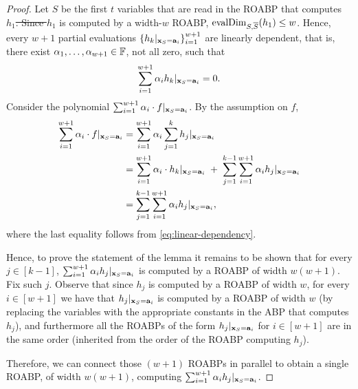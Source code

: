\documentclass[11pt]{article}
\providecommand{\DIFadd}[1]{{\protect\color{blue}\uwave{#1}}} %
\providecommand{\DIFdel}[1]{{\protect\color{red}\sout{#1}}}                      %
\providecommand{\DIFaddbegin}{} %
\providecommand{\DIFaddend}{} %
\providecommand{\DIFdelbegin}{} %
\providecommand{\DIFdelend}{} %
\begin{document}
\begin{proof}
Let $S$ be the first $t$ variables that are read in the ROABP that computes \DIFdelbegin \DIFdel{$h_1$. Since $h_1$ }\DIFdelend \DIFaddbegin \DIFadd{$h_k$. Since $h_k$ }\DIFaddend is computed by a width-$w$ ROABP, $\operatorname{evalDim}_{S, \overline{S}} (h_1) \le w$. Hence, every $w+1$ partial evaluations $\left\{ h_k|_{\mathbf{x}_S=\mathbf{a}_i} \right\}_{i=1}^{w+1}$ are linearly dependent, that is, there exist  $\alpha_1, \ldots, \alpha_{w+1} \in \F$, not all zero, such that
\begin{equation}
\label{eq:linear-dependency}
\sum_{i=1}^{w+1} \alpha_i h_k|_{\mathbf{x}_S = \mathbf{a}_i} = 0.
\end{equation}
Consider the polynomial $\sum_{i=1}^{w+1} \alpha_i \cdot f|_{\mathbf{x}_S = \mathbf{a}_i}$. By the assumption on $f$,
\begin{align}
\label{eq:sum-of-c-1}
\sum_{i=1}^{w+1} \alpha_i \cdot f|_{\mathbf{x}_S = \mathbf{a}_i} & = \sum_{i=1}^{w+1} \alpha_i \sum_{j=1}^k h_j |_{\mathbf{x}_S = \mathbf{a}_i} \nonumber \\
&= \sum_{i=1}^{w+1} \alpha_i \cdot  h_k|_{\mathbf{x}_S = \mathbf{a}_i} \;+\; \sum_{j=1}^{k-1}  \sum_{i=1}^{w+1} \alpha_i h_j |_{\mathbf{x}_S = \mathbf{a}_i} \nonumber \\
&=  \sum_{j=1}^{k-1}  \sum_{i=1}^{w+1} \alpha_i h_j |_{\mathbf{x}_S = \mathbf{a}_i},
\end{align}
where the last equality follows from \eqref{eq:linear-dependency}.

Hence, to prove the statement of the lemma it remains to be shown that for every $j \in [k-1]$, $\sum_{i=1}^{w+1} \alpha_i h_j |_{\mathbf{x}_S = \mathbf{a}_i}$ is computed by a ROABP of width $w(w+1)$. Fix such $j$. Observe that since $h_j$ is computed by a ROABP of width $w$, for every $i \in [w+1]$ we have that $h_j |_{\mathbf{x}_S = \mathbf{a}_i}$ is computed by a ROABP of width $w$ (by replacing the variables with the appropriate constants in the ABP that computes $h_j$), and furthermore all the ROABPs of the form $h_j |_{\mathbf{x}_S = \mathbf{a}_i}$ for $i \in [w+1]$ are in the same order (inherited from the order of the ROABP computing $h_j$).

Therefore, we can connect those $(w+1)$ ROABPs in parallel to obtain a single ROABP, of width $w(w+1)$, computing  $\sum_{i=1}^{w+1} \alpha_i h_j |_{\mathbf{x}_S = \mathbf{a}_i}$.
\end{proof}
\end{document}
